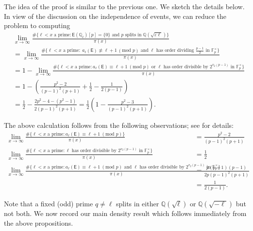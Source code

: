 \documentclass{amsart}
\numberwithin{equation}{section}
\theoremstyle{remark}
\newcommand{\Q}{\mathbb{Q}}
\newcommand{\EC}{\mathsf{E}}
\theoremstyle{plain} %
\begin{document}
The idea of the proof is similar to the previous one.
We sketch the details below.
In view of the discussion on the independence of events, we can reduce the problem to computing
\begin{align*}
\label{what we want to count in p 3 mod 4 case}
&\lim_{x\rightarrow\infty} \frac{\# \{\ell < x \text{ a prime} \colon \EC(\Q_{\ell} )[p] = \{0\} \text{ and }p \text{ splits in } \Q(\sqrt{\varepsilon\ell})\}}{\pi(x)} \\
&= \lim_{x\rightarrow\infty} \frac{\# \{\ell < x \text{ a prime} \colon \  a_{\ell}(\EC) \not\equiv \ell+1 \ (\text{mod }{p}) \text{ and } \ell \text{ has order dividing $\frac{p-1}{2}$ in }\mathbb{F}_p^\times\}}{\pi(x)} \\
& = 1 - \lim_{x\rightarrow\infty} \frac{\# \{\ell < x \text{ a prime} \colon  a_{\ell}(\EC) \equiv \ell+1 \ (\text{mod }{p}) \text{ or } \ell \text{ has order divisible by $2^{v_2(p-1)}$ in }\mathbb{F}_p^\times\}}{\pi(x)} \\
& = 1 - \left( \frac{p^2 -2}{(p-1)^2(p+1)} + \frac{1}{2} - \frac{1}{2(p-1)}\right)\\
& = \frac{1}{2} - \frac{2p^2 - 4 - (p^2-1)}{2(p-1)^2(p+1)} = \frac{1}{2}\left( 1 - \frac{p^2 - 3}{(p-1)^2(p+1)}\right).
\end{align*}

The above calculation follows from the following observations; see \cite[Section~3.2]{HK23} for details:
\begin{align*}
\lim_{x\rightarrow\infty} \frac{\# \{\ell < x \text{ a prime} \colon a_{\ell}(\EC) \equiv \ell+1 \ (\text{mod }{p})\}}{\pi(x)} & = \frac{p^2 -2}{(p-1)^2(p+1)} \\
\lim_{x\rightarrow\infty} \frac{\# \{\ell < x \text{ a prime} \colon \ell \text{ has order divisible by $2^{v_2(p-1)}$ in $\mathbb{F}_p^\times$}\}}{\pi(x)} & = \frac{1}{2} \\
\lim_{x\rightarrow\infty} \frac{\# \{\ell < x \text{ a prime} \colon  a_{\ell}(\EC) \equiv \ell+1 \ (\text{mod }{p}) \text{ and } \ell\text{ has order divisible by $2^{v_2(p-1)}$ in $\mathbb{F}_p^\times$} \}}{\pi(x)} &= \frac{p(p+1)(p-1)}{2p(p-1)^2(p+1)}\\
& = \frac{1}{2(p-1)}.
\end{align*}

Note that a fixed (odd) prime $q\neq \ell$ splits in either $\Q(\sqrt{\ell})$ or $\Q(\sqrt{-\ell})$ but not both.
We now record our main density result which follows immediately from the above propositions.
\end{document}
